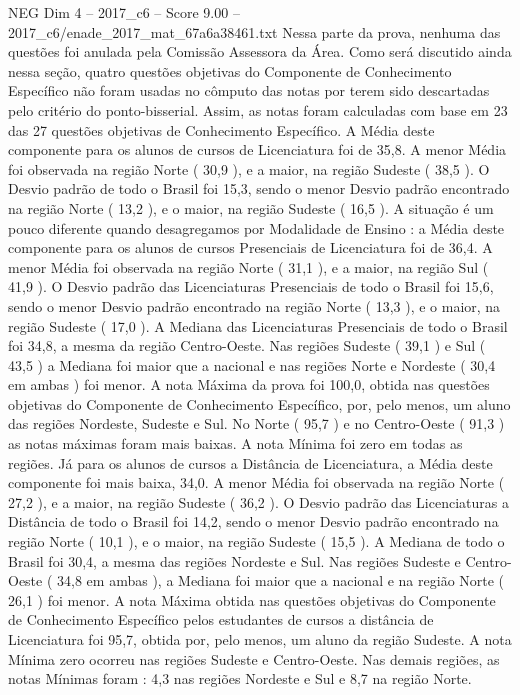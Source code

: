 \begin{textsample}{NEG Dim 4 – 2017\_c6 – Score 9.00 – 2017\_c6/enade\_2017\_mat\_67a6a38461.txt}
Nessa parte da prova, nenhuma das questões foi anulada pela Comissão Assessora da Área.
Como será discutido ainda nessa seção, quatro questões objetivas do Componente de Conhecimento Específico não foram usadas no cômputo das notas por terem sido descartadas pelo critério do ponto-bisserial.
Assim, as notas foram calculadas com base em 23 das 27 questões objetivas de Conhecimento Específico.
A Média deste componente para os alunos de cursos de Licenciatura foi de 35,8.
A menor Média foi observada na região Norte ( 30,9 ), e a maior, na região Sudeste ( 38,5 ).
O Desvio padrão de todo o Brasil foi 15,3, sendo o menor Desvio padrão encontrado na região Norte ( 13,2 ), e o maior, na região Sudeste ( 16,5 ).
A situação é um pouco diferente quando desagregamos por Modalidade de Ensino : a Média deste componente para os alunos de cursos Presenciais de Licenciatura foi de 36,4.
A menor Média foi observada na região Norte ( 31,1 ), e a maior, na região Sul ( 41,9 ).
O Desvio padrão das Licenciaturas Presenciais de todo o Brasil foi 15,6, sendo o menor Desvio padrão encontrado na região Norte ( 13,3 ), e o maior, na região Sudeste ( 17,0 ).
A Mediana das Licenciaturas Presenciais de todo o Brasil foi 34,8, a mesma da região Centro-Oeste.
Nas regiões Sudeste ( 39,1 ) e Sul ( 43,5 ) a Mediana foi maior que a nacional e nas regiões Norte e Nordeste ( 30,4 em ambas ) foi menor.
A nota Máxima da prova foi 100,0, obtida nas questões objetivas do Componente de Conhecimento Específico, por, pelo menos, um aluno das regiões Nordeste, Sudeste e Sul.
No Norte ( 95,7 ) e no Centro-Oeste ( 91,3 ) as notas máximas foram mais baixas.
A nota Mínima foi zero em todas as regiões.
Já para os alunos de cursos a Distância de Licenciatura, a Média deste componente foi mais baixa, 34,0.
A menor Média foi observada na região Norte ( 27,2 ), e a maior, na região Sudeste ( 36,2 ).
O Desvio padrão das Licenciaturas a Distância de todo o Brasil foi 14,2, sendo o menor Desvio padrão encontrado na região Norte ( 10,1 ), e o maior, na região Sudeste ( 15,5 ).
A Mediana de todo o Brasil foi 30,4, a mesma das regiões Nordeste e Sul.
Nas regiões Sudeste e Centro-Oeste ( 34,8 em ambas ), a Mediana foi maior que a nacional e na região Norte ( 26,1 ) foi menor.
A nota Máxima obtida nas questões objetivas do Componente de Conhecimento Específico pelos estudantes de cursos a distância de Licenciatura foi 95,7, obtida por, pelo menos, um aluno da região Sudeste.
A nota Mínima zero ocorreu nas regiões Sudeste e Centro-Oeste.
Nas demais regiões, as notas Mínimas foram : 4,3 nas regiões Nordeste e Sul e 8,7 na região Norte.

\end{textsample}
